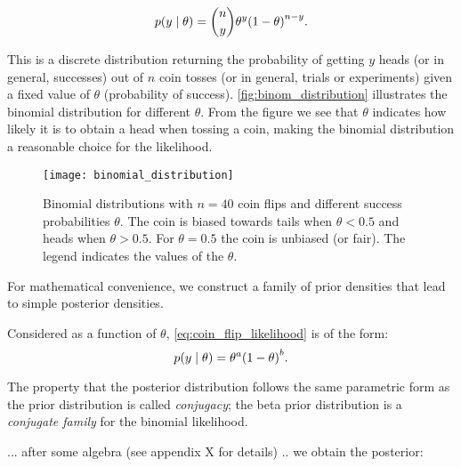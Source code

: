 \begin{equation}\label{eq:coin_flip_likelihood}
    p \qty(y \mid \theta) = \binom{n}{y} \theta^y \qty(1 - \theta)^{n-y}.
\end{equation}

This is a discrete distribution returning the probability of getting $y$ heads (or in general, successes) out of $n$ coin tosses (or in general, trials or experiments) given a fixed value of $\theta$ (probability of success). \autoref{fig:binom_distribution} illustrates the binomial distribution for different $\theta$. From the figure we see that $\theta$ indicates how likely it is to obtain a head when tossing a coin, making the binomial distribution a reasonable choice for the likelihood. 

\begin{figure}[H]
    \centering
    \texttt{[image: binomial\_distribution]}
    \caption{Binomial distributions with $n=40$ coin flips and different success probabilities $\theta$. The coin is biased towards tails when $\theta < 0.5$ and heads when $\theta > 0.5$. For $\theta=0.5$ the coin is unbiased (or fair). The legend indicates the values of the $\theta$.}
    \label{fig:binom_distribution}
\end{figure} 

For mathematical convenience, we construct a family of prior densities that lead to simple posterior densities. 

Considered as a function of $\theta$, \autoref{eq:coin_flip_likelihood} is of the form: 
\begin{equation}\label{eq:coin_flip_likelihood_theta}
    p \qty(y \mid \theta) = \theta^a \qty(1 - \theta)^b.
\end{equation}


The property that the posterior distribution follows the same parametric form as the prior distribution is called \textit{conjugacy}; the beta prior distribution is a \textit{conjugate family} for the binomial likelihood. 


... after some algebra (see appendix X for details) .. we obtain the posterior:


